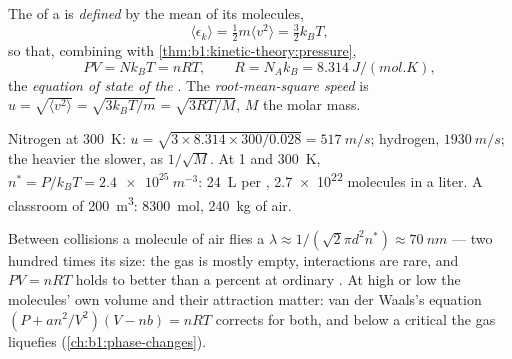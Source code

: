\begin{definition}\label{def:b1:kinetic-theory:kinetictemp}
The  of a  is \emph{defined} by the mean  of its molecules,
\[
\langle\epsilon_k\rangle = \tfrac12 m\langle v^2\rangle = \tfrac32 k_BT ,
\]
so that, combining with \cref{thm:b1:kinetic-theory:pressure},
\[
PV = Nk_BT = nRT, \qquad R = N_Ak_B = \qty{8.314}{J/(mol.K)} ,
\]
the \emph{equation of state of the }. The \emph{root-mean-square
speed} is $u = \sqrt{\langle v^2\rangle} = \sqrt{3k_BT/m} = \sqrt{3RT/M}$,
$M$ the molar mass.
\end{definition}

\begin{example}\label{ex:b1:kinetic-theory:air}
Nitrogen at \qty{300}{K}: $u = \sqrt{3 \times 8.314 \times 300/0.028} =
\qty{517}{m/s}$; hydrogen, $\qty{1930}{m/s}$; the heavier the slower, as
$1/\sqrt M$. At \qty{1}{} and \qty{300}{K}, $n^* = P/k_BT = \qty{2.4e25}{m^{-3}}$:
\qty{24}{L} per , \qty{2.7e22}{} molecules in a liter. A classroom of
\qty{200}{m^3}: \qty{8300}{mol}, \qty{240}{kg} of air.
\end{example}

\begin{remark}\label{rem:b1:kinetic-theory:validity}
Between collisions a molecule of air flies a \emph{}
$\lambda \approx 1/(\sqrt2\pi d^2n^*) \approx \qty{70}{nm}$ --- two hundred
times its size: the gas is mostly empty, interactions are rare, and
$PV = nRT$ holds to better than a percent at ordinary . At high
 or low  the molecules' own volume and their
attraction matter: van der Waals's equation $(P + an^2/V^2)(V - nb) = nRT$
corrects for both, and below a critical  the gas liquefies
(\cref{ch:b1:phase-changes}).
\end{remark}

